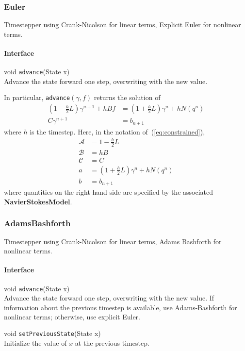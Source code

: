 \documentclass[11pt]{article}
\def\class#1{{\bf #1}} %
\def\fn#1{{\tt #1}} %
\begin{document}
\subsubsection{Euler}
Timestepper using Crank-Nicolson for linear terms, Explicit Euler for nonlinear terms.

\paragraph{Interface}
\begin{description}
	\item void \fn{advance}(State x)\\
		Advance the state forward one step, overwriting with the new value.  
\end{description}

In particular, \fn{advance}$(\gamma,f)$ returns the solution of
	\begin{align}
		(1-\frac{h}{2}L)\gamma^{n+1} + hBf &= (1 + \frac{h}{2}L)\gamma^n + h N(q^n)\\
		C\gamma^{n+1} &= b_{n+1}
	\end{align}
where $h$ is the timestep.  Here, in the notation of~(\ref{eq:constrained}),
\begin{align}
	\mathcal{A} &= 1-\frac{h}{2} L\\
	\mathcal{B} &= hB\\
	\mathcal{C} &= C\\
	a &= (1+\frac{h}{2}L)\gamma^n + hN(q^n)\\
	b &= b_{n+1}
\end{align}
where quantities on the right-hand side are specified by the associated \class{NavierStokesModel}.

\subsubsection{AdamsBashforth}
Timestepper using Crank-Nicolson for linear terms, Adams Bashforth for nonlinear terms.

\paragraph{Interface}
\begin{description}
	\item void \fn{advance}(State x)\\
		Advance the state forward one step, overwriting with the new value.  If information about the previous timestep is available, use Adams-Bashforth for nonlinear terms; otherwise, use explicit Euler.
	\item void \fn{setPreviousState}(State x)\\
		Initialize the value of $x$ at the previous timestep.
\end{description}
\end{document}

